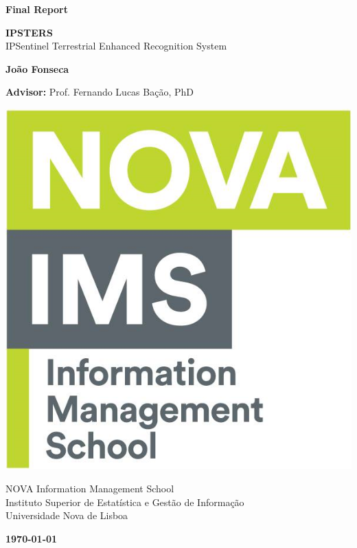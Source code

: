\documentclass[12pt, english, openany]{book}
\begin{document}

\begin{titlepage}
	\clearpage\thispagestyle{empty}
	\centering
	\vspace{.5cm}

	{\large \textbf{Final Report} \par}
	\vspace{2.5cm}
	{\Huge \textbf{IPSTERS}} \\
  \vspace{1cm}
  {\Huge IPSentinel Terrestrial Enhanced Recognition System} \\
	\vspace{2.5cm}
	{\large \textbf{João Fonseca} \par}
	\vspace{.5cm}
	{\large \textbf{Advisor:} Prof. Fernando Lucas Bação, PhD \par}

	\vspace{1.5cm}
    \includegraphics[scale=0.2]{ims_logo.png}
  \vspace{1.3cm}

	{\normalsize NOVA Information Management School \\
		Instituto Superior de Estatística e Gestão de Informação \\
		Universidade Nova de Lisboa \par}

  \vspace{1.5cm}

	{\normalsize \textbf \today \par}
	\pagebreak
\end{titlepage}
\end{document}
